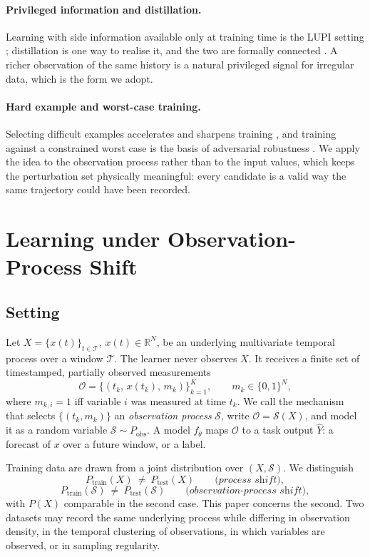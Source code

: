 \documentclass[sigconf,nonacm]{acmart}
\newcommand{\Sobs}{\mathcal{S}}
\newcommand{\Oobs}{\mathcal{O}}
\begin{document}
\paragraph{Privileged information and distillation.}
Learning with side information available only at training time is the LUPI setting \cite{vapnik2015lupi};
distillation \cite{hinton2015distilling} is one way to realise it, and the two are formally connected
\cite{lopezpaz2016unifying}. A richer observation of the same history is a natural privileged signal for
irregular data, which is the form we adopt.

\paragraph{Hard example and worst-case training.}
Selecting difficult examples accelerates and sharpens training \cite{shrivastava2016ohem}, and training against
a constrained worst case is the basis of adversarial robustness \cite{madry2018towards}. We apply the idea to
the observation process rather than to the input values, which keeps the perturbation set physically meaningful:
every candidate is a valid way the same trajectory could have been recorded.

\section{Learning under Observation-Process Shift}
\label{sec:problem}

\subsection{Setting}
Let $X=\{x(t)\}_{t\in\mathcal{T}}$, $x(t)\in\mathbb{R}^{N}$, be an underlying multivariate temporal process over
a window $\mathcal{T}$. The learner never observes $X$. It receives a finite set of timestamped, partially
observed measurements
\begin{equation}
\Oobs=\{(t_k,\,x(t_k),\,m_k)\}_{k=1}^{K},\qquad m_k\in\{0,1\}^{N},
\end{equation}
where $m_{k,i}=1$ iff variable $i$ was measured at time $t_k$. We call the mechanism that selects
$\{(t_k,m_k)\}$ an \emph{observation process} $\Sobs$, write $\Oobs=\Sobs(X)$, and model it as a random variable
$\Sobs\sim P_{\mathrm{obs}}$. A model $f_\theta$ maps $\Oobs$ to a task output $\hat{Y}$: a forecast of $x$ over
a future window, or a label.

Training data are drawn from a joint distribution over $(X,\Sobs)$. We distinguish
\begin{equation}
P_{\mathrm{train}}(X)\ \neq\ P_{\mathrm{test}}(X)
\qquad\textit{(process shift)},
\end{equation}
\begin{equation}
P_{\mathrm{train}}(\Sobs)\ \neq\ P_{\mathrm{test}}(\Sobs)
\qquad\textit{(observation-process shift)},
\end{equation}
with $P(X)$ comparable in the second case. This paper concerns the second. Two datasets may record the same
underlying process while differing in observation density, in the temporal clustering of observations, in which
variables are observed, or in sampling regularity.
\end{document}
